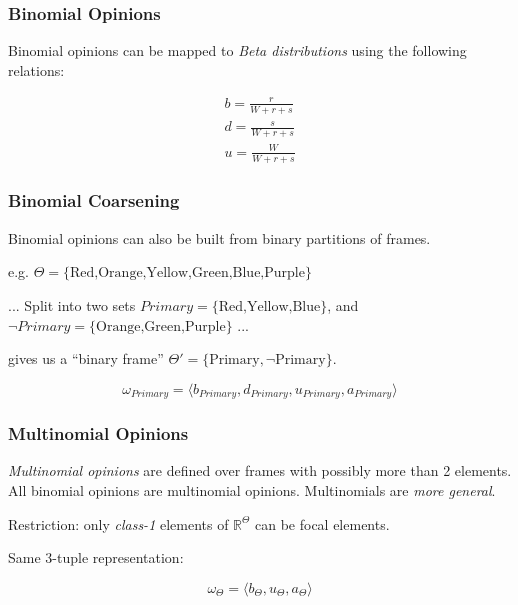 \documentclass{beamer}
\begin{document}

\begin{frame}
\frametitle{Binomial Opinions}

Binomial opinions can be mapped to \emph{Beta distributions} using the following relations:

$$
\begin{array}{l}
  b = \frac{r}{W + r + s} \\
  d = \frac{s}{W + r + s} \\
  u = \frac{W}{W + r + s}
\end{array}
$$

\end{frame}


\begin{frame}
\frametitle{Binomial Coarsening}

Binomial opinions can also be built from binary partitions of frames.

e.g. $\Theta = \lbrace \mbox{Red,Orange,Yellow,Green,Blue,Purple} \rbrace$

... Split into two sets $Primary = \lbrace \mbox{Red,Yellow,Blue} \rbrace$, and
$\lnot Primary = \lbrace \mbox{Orange,Green,Purple} \rbrace$ ...

gives us a ``binary frame'' $\Theta' = \lbrace \mbox{Primary}, \lnot \mbox{Primary} \rbrace$.

$$
\omega_{Primary} = \langle b_{Primary}, d_{Primary}, u_{Primary}, a_{Primary} \rangle
$$

\end{frame}



\begin{frame}
\frametitle{Multinomial Opinions}

\emph{Multinomial opinions} are defined over frames with possibly more than 2 elements.
All binomial opinions are multinomial opinions. Multinomials are \emph{more general}.

Restriction: only \emph{class-1} elements of $\mathbb{R}^\Theta$ can be focal elements.

Same 3-tuple representation:

$$
\omega_\Theta = \langle b_\Theta, u_\Theta, a_\Theta \rangle
$$

\end{frame}
\end{document}
